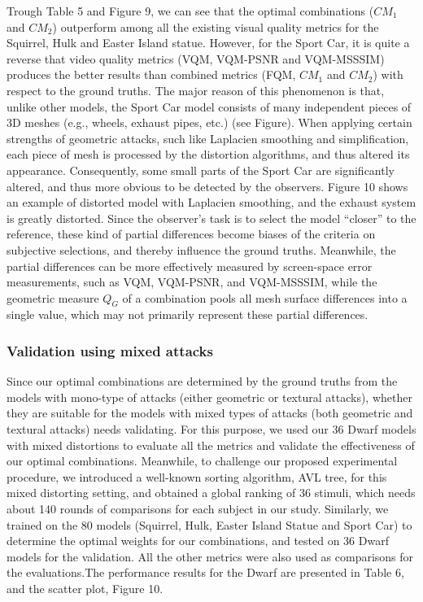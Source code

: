 Trough Table 5 and Figure 9, we can see that the optimal combinations ($CM_1$ and $CM_2$) outperform among all the existing visual quality metrics for the Squirrel, Hulk and Easter Island statue. However, for the Sport Car, it is quite a reverse that video quality metrics (VQM, VQM-PSNR and VQM-MSSSIM) produces the better results than combined metrics (FQM, $CM_1$ and $CM_2$) with respect to the ground truths. The major reason of this phenomenon is that, unlike other models, the Sport Car model consists of many independent pieces of 3D meshes (e.g., wheels, exhaust pipes, etc.) (see Figure). When applying certain strengths of geometric attacks, such like Laplacien smoothing and simplification, each piece of mesh is processed by the distortion algorithms, and thus altered its appearance. Consequently, some small parts of the Sport Car are significantly altered, and thus more obvious to be detected by the observers. Figure 10 shows an example of distorted model with Laplacien smoothing, and the exhaust system is greatly distorted. Since the observer’s task is to select the model “closer” to the reference, these kind of partial differences become biases of the criteria on subjective selections, and thereby influence the ground truths. Meanwhile, the partial differences can be more effectively measured by screen-space error measurements, such as VQM, VQM-PSNR, and VQM-MSSSIM, while the geometric measure $Q_G$ of a combination pools all mesh surface differences into a single value, which may not primarily represent these partial differences.\\
\subsubsection{Validation using mixed attacks}
Since our optimal combinations are determined by the ground truths from the models with mono-type of attacks (either geometric or textural attacks), whether they are suitable for the models with mixed types of attacks (both geometric and textural attacks) needs validating. For this purpose, we used our 36 Dwarf models with mixed distortions to evaluate all the metrics and validate the effectiveness of our optimal combinations. Meanwhile, to challenge our proposed experimental procedure, we introduced a well-known sorting algorithm, AVL tree, for this mixed distorting setting, and obtained a global ranking of 36 stimuli, which needs about 140 rounds of comparisons for each subject in our study. Similarly, we trained on the 80 models (Squirrel, Hulk, Easter Island Statue and Sport Car) to determine the optimal weights for our combinations, and tested on 36 Dwarf models for the validation. All the other metrics were also used as comparisons for the evaluations.The performance results for the Dwarf are presented in Table 6, and the scatter plot, Figure 10.\\

